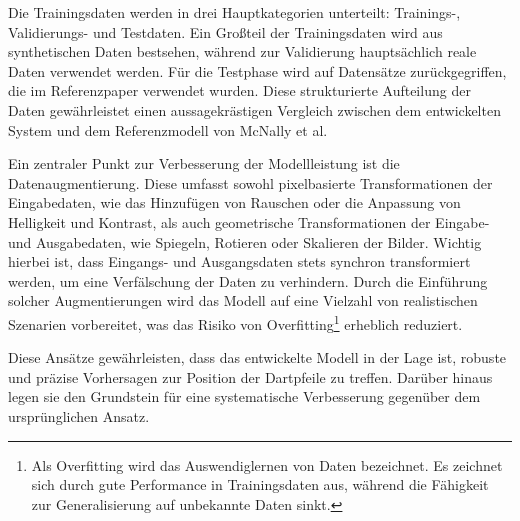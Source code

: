 Die Trainingsdaten werden in drei Hauptkategorien unterteilt: Trainings-, Validierungs- und Testdaten.
Ein Großteil der Trainingsdaten wird aus synthetischen Daten bestsehen, während zur Validierung hauptsächlich reale Daten verwendet werden. Für die Testphase wird auf Datensätze zurückgegriffen, die im Referenzpaper verwendet wurden. Diese strukturierte Aufteilung der Daten gewährleistet einen aussagekrästigen Vergleich zwischen dem entwickelten System und dem Referenzmodell von McNally et al.

Ein zentraler Punkt zur Verbesserung der Modellleistung ist die Datenaugmentierung. Diese umfasst sowohl pixelbasierte Transformationen der Eingabedaten, wie das Hinzufügen von Rauschen oder die Anpassung von Helligkeit und Kontrast, als auch geometrische Transformationen der Eingabe- und Ausgabedaten, wie Spiegeln, Rotieren oder Skalieren der Bilder. Wichtig hierbei ist, dass Eingangs- und Ausgangsdaten stets synchron transformiert werden, um eine Verfälschung der Daten zu verhindern. Durch die Einführung solcher Augmentierungen wird das Modell auf eine Vielzahl von realistischen Szenarien vorbereitet, was das Risiko von Overfitting\footnote{Als Overfitting wird das Auswendiglernen von Daten bezeichnet. Es zeichnet sich durch gute Performance in Trainingsdaten aus, während die Fähigkeit zur Generalisierung auf unbekannte Daten sinkt.} erheblich reduziert.

Diese Ansätze gewährleisten, dass das entwickelte Modell in der Lage ist, robuste und präzise Vorhersagen zur Position der Dartpfeile zu treffen. Darüber hinaus legen sie den Grundstein für eine systematische Verbesserung gegenüber dem ursprünglichen Ansatz.


